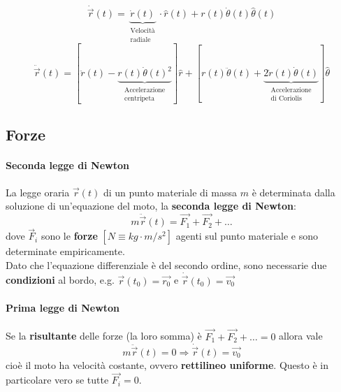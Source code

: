 \begin{equation}
	\dot{\vec{r}}(t) = \underbrace{\dot{r}(t)}_{\substack{\text{Velocità}\\\text{radiale}}} \cdot \widehat{r}(t)+r(t)\dot{\theta}(t)\widehat{\theta}(t)
\end{equation}
\begin{equation}
	\label{eq:polaracc}
	\ddot{\vec{r}}(t) = [\ddot{r}(t) - \underbrace{r(t)\dot{\theta}(t)^2}_{\substack{\text{Accelerazione}\\\text{centripeta}}}]\widehat{r} + [r(t) \ddot{\theta}(t)+\underbrace{2\dot{r}(t)\dot{\theta}(t)}_{\substack{\text{Accelerazione}\\\text{di Coriolis}}}]\widehat{\theta}
\end{equation}

\subsection{Forze}
\paragraph{Seconda legge di Newton}
La legge oraria $\vec{r}(t)$ di un punto materiale di massa $m$ è determinata dalla soluzione di un'equazione del moto, la \textbf{seconda legge di Newton}:
\begin{equation}
	m \ddot{\vec{r}}(t) = \vec{F_1} + \vec{F_2} + \ldots
\end{equation}
dove $\vec{F}_i$ sono le \textbf{forze} $[N \equiv kg \cdot m/s^2]$ agenti sul punto materiale e sono determinate empiricamente.\\

Dato che l'equazione differenziale è del secondo ordine, sono necessarie due \textbf{condizioni} al bordo, e.g. $\vec{r}(t_0) = \vec{r_0}$ e $\dot{\vec{r}}(t_0) = \vec{v_0}$
\paragraph{Prima legge di Newton}
Se la \textbf{risultante} delle forze (la loro somma) è $\vec{F_1} + \vec{F_2}+\ldots = 0$ allora vale
\begin{equation}
	m\ddot{\vec{r}}(t) = 0 \Longrightarrow \dot{\vec{r}}(t)=\vec{v_0}
\end{equation}
cioè il moto ha velocità costante, ovvero \textbf{rettilineo uniforme}. Questo è in particolare vero se tutte $\vec{F_i}=0$.

